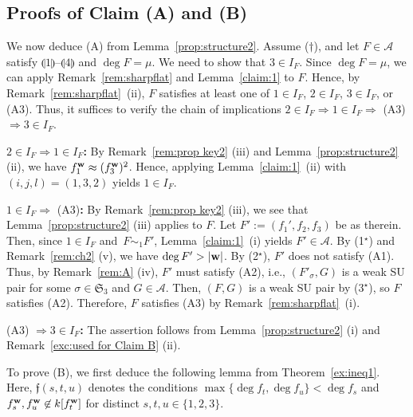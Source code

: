\documentclass{amsart}
\theoremstyle{plain}
\theoremstyle{definition}
\newcommand{\A}{\mathcal{A}}
\newcommand{\nd}{\noindent}
\newcommand{\w}{{\bf w}}
\newcommand{\sym}{\mathfrak{S}}
\begin{document}
\subsection{Proofs of Claim (A) and (B)}\label{subsect:kouhan}


We now deduce (A) from Lemma~\ref{prop:structure2}. 
Assume ($\dag $), 
and let $F\in \A $ satisfy 
$\llparenthesis 1 \rrparenthesis$--$\llparenthesis 4 \rrparenthesis$ 
and $\deg F=\mu $. 
We need to show that $3\in I_F$. 
Since $\deg F=\mu $, 
we can apply Remark~\ref{rem:sharpflat} and Lemma~\ref{claim:1} to $F$. 
Hence, by Remark~\ref{rem:sharpflat}~(ii), 
$F$ satisfies at least one of 
$1\in I_F$, 
$2\in I_F$, 
$3\in I_F$, 
or (A3). 
Thus, it suffices to verify the chain of implications 
$2\in I_F\Rightarrow 1\in I_F\Rightarrow $ 
(A3) $\Rightarrow 3\in I_F$. 


\smallskip 


\nd $2\in I_F\Rightarrow 1\in I_F$\textbf{:} 
By Remark~\ref{rem:prop key2} (iii) 
and Lemma~\ref{prop:structure2} (ii), 
we have 
$f_1^{\w }\approx (f_3^{\w })^2$. 
Hence, 
applying Lemma~\ref{claim:1}~(ii) with $(i,j,l)=(1,3,2)$ 
yields $1\in I_F$. 


\nd $1\in I_F\Rightarrow $ (A3)\textbf{:} 
By Remark~\ref{rem:prop key2} (iii), 
we see that 
Lemma~\ref{prop:structure2} (iii) applies to $F$. 
Let $F':=(f_1',f_2,f_3)$ be as therein. 
Then, since $1\in I_F$ and~$F\sim _1F'$, 
Lemma~\ref{claim:1}~(i) yields $F'\in \A $. 
By (1$^\star $) and Remark~\ref{rem:ch2} (v), 
we have $\deg F'>|\w |$. 
By (2$^\star $), 
$F'$ does not satisfy (A1). 
Thus, 
by Remark~\ref{rem:A} (iv), $F'$ must satisfy (A2), 
i.e., 
$(F'_\sigma ,G)$ is a weak SU pair 
for some $\sigma \in \sym _3$ and $G\in \A $. 
Then, 
$(F,G)$ is a weak SU pair by (3$^\star $), 
so $F$ satisfies (A2). 
Therefore, 
$F$ satisfies (A3) 
by Remark~\ref{rem:sharpflat}~(i). 


\nd (A3) $\Rightarrow 3\in I_F$\textbf{:} 
The assertion follows from 
Lemma~\ref{prop:structure2} (i) 
and Remark~\ref{exc:used for Claim B} (ii). 



\smallskip 


To prove (B), 
we first deduce the following lemma from 
Theorem~\ref{ex:ineq1}. 
Here, 
$\mathfrak{f}(s,t,u)$ denotes the conditions 
$\max \{ \deg f_t,\deg f_u\} <\deg f_s$ and 
$f_s^{\w },f_u^{\w }\not\in k[f_t^{\w }]$ 
for distinct $s,t,u\in \{ 1,2,3\} $. 
\end{document}
